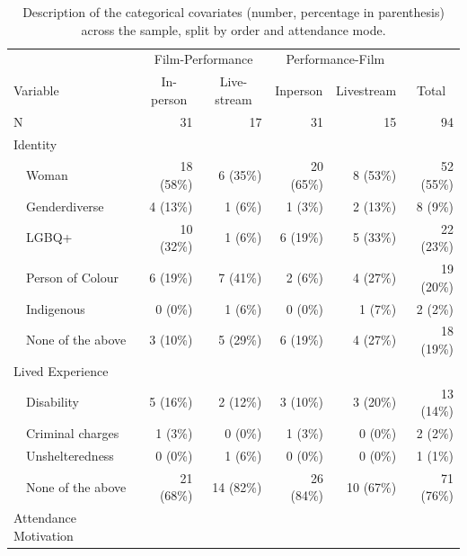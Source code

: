 \documentclass[
  man,floatsintext]{apa6}
\begin{document}
\begin{table}[tbp]
\begin{center}
\begin{threeparttable}
\end{threeparttable}
\end{center}

\end{table}



\begin{table}[tbp]

\begin{center}
\begin{threeparttable}

\caption{\label{tab:cat-sample-description}Description of the categorical covariates (number, percentage in parenthesis) across the sample, split by order and attendance mode.}

\begin{tabular}{lrrrrr}
\toprule
 & \multicolumn{2}{c}{Film-Performance} & \multicolumn{2}{c}{Performance-Film}  &\\
\cmidrule(r){2-3} \cmidrule(r){4-5}
Variable & \multicolumn{1}{c}{In-person} & \multicolumn{1}{c}{Live-stream} & \multicolumn{1}{c}{Inperson} & \multicolumn{1}{c}{Livestream} & \multicolumn{1}{c}{Total}\\
\midrule
N & 31 & 17 & 31 & 15 & 94\\
Identity &  &  &  &  & \\
\ \  Woman & 18 (58\%) & 6 (35\%) & 20 (65\%) & 8 (53\%) & 52 (55\%)\\
\ \  Genderdiverse & 4 (13\%) & 1 (6\%) & 1 (3\%) & 2 (13\%) & 8 (9\%)\\
\ \  LGBQ+ & 10 (32\%) & 1 (6\%) & 6 (19\%) & 5 (33\%) & 22 (23\%)\\
\ \  Person of Colour & 6 (19\%) & 7 (41\%) & 2 (6\%) & 4 (27\%) & 19 (20\%)\\
\ \  Indigenous & 0 (0\%) & 1 (6\%) & 0 (0\%) & 1 (7\%) & 2 (2\%)\\
\ \  None of the above & 3 (10\%) & 5 (29\%) & 6 (19\%) & 4 (27\%) & 18 (19\%)\\
Lived Experience &  &  &  &  & \\
\ \  Disability & 5 (16\%) & 2 (12\%) & 3 (10\%) & 3 (20\%) & 13 (14\%)\\
\ \  Criminal charges & 1 (3\%) & 0 (0\%) & 1 (3\%) & 0 (0\%) & 2 (2\%)\\
\ \  Unshelteredness & 0 (0\%) & 1 (6\%) & 0 (0\%) & 0 (0\%) & 1 (1\%)\\
\ \  None of the above & 21 (68\%) & 14 (82\%) & 26 (84\%) & 10 (67\%) & 71 (76\%)\\
Attendance Motivation &  &  &  &  & \\

\end{tabular}
\end{threeparttable}
\end{center}
\end{table}
\end{document}
